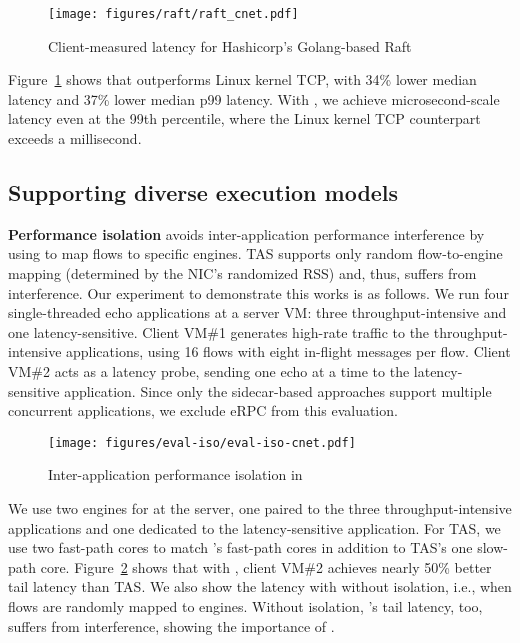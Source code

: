 \begin{figure}[t!]
    \centering
    \texttt{[image: figures/raft/raft\_cnet.pdf]}
    \caption{Client-measured latency for Hashicorp's Golang-based Raft}
    \label{fig:raft}
    \vspace{-0.5cm}
\end{figure}

Figure~\ref{fig:raft} shows that \mt{} outperforms Linux kernel TCP, with 34\% lower median latency and 37\% lower median p99 latency.
With \mt{}, we achieve microsecond-scale latency even at the 99th percentile, where the Linux kernel TCP counterpart exceeds a millisecond.


\subsection{Supporting diverse execution models}
\label{subsec:app-isolation}

\textbf{Performance isolation} \mt{} avoids inter-application performance interference by using \rssminus{} to map flows to specific \mt{} engines.
TAS supports only random flow-to-engine mapping (determined by the NIC's randomized RSS) and, thus, suffers from interference.
Our experiment to demonstrate this works is as follows.
We run four single-threaded echo applications at a server VM: three throughput-intensive and one latency-sensitive.
Client VM\#1 generates high-rate traffic to the throughput-intensive applications, using 16 flows with eight  in-flight messages per flow.
Client VM\#2 acts as a latency probe, sending one  echo at a time to the latency-sensitive application.
Since only the sidecar-based approaches support multiple concurrent applications, we exclude eRPC from this evaluation.

\begin{figure}
    \centering
    \texttt{[image: figures/eval-iso/eval-iso-cnet.pdf]}
    \caption{Inter-application performance isolation in \mt{}}
    \label{fig:eval-iso}
    \vspace{-0.1in}
\end{figure}


We use two engines for \mt{} at the server, one paired to the three throughput-intensive applications and one dedicated to the latency-sensitive application.
For TAS, we use two fast-path cores to match \mt{}'s fast-path cores in addition to TAS's one slow-path core.
Figure~\ref{fig:eval-iso} shows that with \mt{}, client VM\#2 achieves nearly 50\% better tail latency than TAS.
We also show the latency with \mt{} without isolation, i.e., when flows are randomly mapped to engines.
Without isolation, \mt{}'s tail latency, too, suffers from interference, showing the importance of \rssminus{}.

